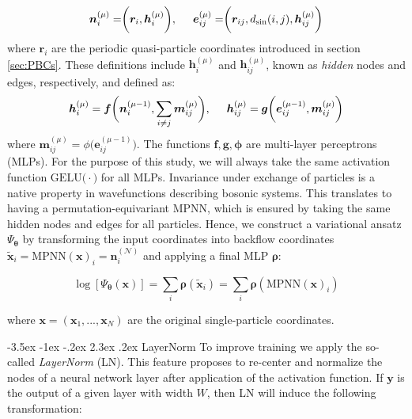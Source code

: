 \documentclass[a4paper, 12pt, oneside]{article}
\makeatletter
\renewcommand{\subsection}{\@startsection{subsection}{1}{\z@}%
             {-3.5ex \@plus-1ex \@minus-.2ex}%
             {2.3ex \@plus.2ex}%
             {\normalfont\normalsize\bfseries}}
\makeatother
\begin{document}
\begin{equation}
    \bm{n}_i^{(\mu)} = \biggr(\bm{r}_i, \bm{h}_i^{(\mu)}\biggr), \hspace{0.5cm} \bm{e}_{ij}^{(\mu)} = \biggr(\bm{r}_{ij},d_{\sin}(i,j), \bm{h}_{ij}^{(\mu)}\biggr)
\end{equation}
where $\bm{r}_i$ are the periodic quasi-particle coordinates introduced in section \ref{sec:PBCs}. 
These definitions include $\bm{h}_i^{(\mu)}$ and $\bm{h}_{ij}^{(\mu)}$, known as {\it hidden} nodes 
and edges, respectively, and defined as:
\begin{equation}
\bm{h}_{i}^{(\mu)} = \bm{f}\biggr(\bm{n}_i^{(\mu-1)}, \sum_{i\neq j} \bm{m}_{ij}^{(\mu)}\biggr), \hspace{0.5cm} \bm{h}_{ij}^{(\mu)} = \bm{g} \biggr(\bm{e}_{ij}^{(\mu-1)}, \bm{m}_{ij}^{(\mu)}\biggr)
\end{equation}
where $\bm{m}_{ij}^{(\mu)} = \phi \big(\bm{e}_{ij}^{(\mu-1)}\big)$. The functions $\bm{f},\bm{g},\bm{\phi}$ are 
multi-layer perceptrons (MLPs). For the purpose of this study, we will always take the same activation function $\text{GELU}\big(\cdot\big)$ 
for all MLPs.
Invariance under exchange of particles is a native property in wavefunctions describing bosonic systems. This 
translates to having a permutation-equivariant MPNN, which is ensured by taking the same hidden nodes 
and edges for all particles. Hence, we construct a variational ansatz $\Psi_{\bm{\theta}}$ by 
transforming the input coordinates into backflow coordinates $\bm{\tilde{x}}_i =\text{MPNN}(\bm{x})_i = \bm{n}_i^{(\mathcal{N})}$ and applying a 
final MLP $\bm{\rho}$: 

\begin{equation}
    \log[\Psi_{\bm{\theta}}(\bm{x})] = \sum_{i}\bm{\rho}(\bm{\tilde{x}}_i)=
    \sum_{i}\bm{\rho}(\text{MPNN}(\bm{x})_{i})
\end{equation}

where $\bm{x} = (\bm{x}_1,...,\bm{x}_N)$ are the original single-particle coordinates.

\subsection{LayerNorm}\label{sec:sec_LN}
To improve training we apply the so-called \textit{LayerNorm} (LN).
This feature proposes to re-center and normalize the nodes of a neural network layer after application 
of the activation function. If $\bm{y}$ is the output of a given layer with width $W$, then LN will 
induce the following transformation:
\end{document}
